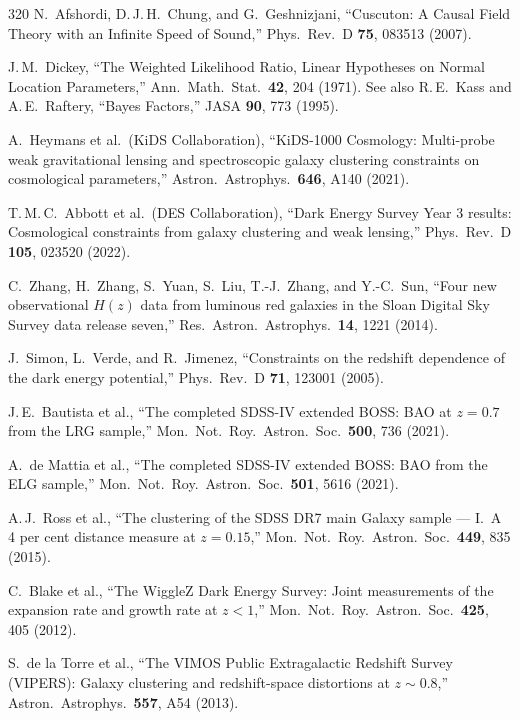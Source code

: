 \begin{thebibliography}{320}
N.\ Afshordi, D.\,J.\,H.\ Chung, and G.\ Geshnizjani,
``Cuscuton: A Causal Field Theory with an Infinite Speed of Sound,''
Phys.\ Rev.\ D \textbf{75}, 083513 (2007).

J.\,M.\ Dickey,
``The Weighted Likelihood Ratio, Linear Hypotheses on Normal Location Parameters,''
Ann.\ Math.\ Stat.\ \textbf{42}, 204 (1971).
See also R.\,E.\ Kass and A.\,E.\ Raftery,
``Bayes Factors,''
JASA \textbf{90}, 773 (1995).

A.\ Heymans et al.\ (KiDS Collaboration),
``KiDS-1000 Cosmology: Multi-probe weak gravitational lensing and spectroscopic galaxy clustering constraints on cosmological parameters,''
Astron.\ Astrophys.\ \textbf{646}, A140 (2021).

T.\,M.\,C.\ Abbott et al.\ (DES Collaboration),
``Dark Energy Survey Year 3 results: Cosmological constraints from galaxy clustering and weak lensing,''
Phys.\ Rev.\ D \textbf{105}, 023520 (2022).

C.\ Zhang, H.\ Zhang, S.\ Yuan, S.\ Liu, T.-J.\ Zhang, and Y.-C.\ Sun,
``Four new observational $H(z)$ data from luminous red galaxies in the Sloan Digital Sky Survey data release seven,''
Res.\ Astron.\ Astrophys.\ \textbf{14}, 1221 (2014).

J.\ Simon, L.\ Verde, and R.\ Jimenez,
``Constraints on the redshift dependence of the dark energy potential,''
Phys.\ Rev.\ D \textbf{71}, 123001 (2005).

J.\,E.\ Bautista et al.,
``The completed SDSS-IV extended BOSS: BAO at $z = 0.7$ from the LRG sample,''
Mon.\ Not.\ Roy.\ Astron.\ Soc.\ \textbf{500}, 736 (2021).

A.\ de Mattia et al.,
``The completed SDSS-IV extended BOSS: BAO from the ELG sample,''
Mon.\ Not.\ Roy.\ Astron.\ Soc.\ \textbf{501}, 5616 (2021).

A.\,J.\ Ross et al.,
``The clustering of the SDSS DR7 main Galaxy sample --- I.\ A 4 per cent distance measure at $z = 0.15$,''
Mon.\ Not.\ Roy.\ Astron.\ Soc.\ \textbf{449}, 835 (2015).

C.\ Blake et al.,
``The WiggleZ Dark Energy Survey: Joint measurements of the expansion rate and growth rate at $z < 1$,''
Mon.\ Not.\ Roy.\ Astron.\ Soc.\ \textbf{425}, 405 (2012).

S.\ de la Torre et al.,
``The VIMOS Public Extragalactic Redshift Survey (VIPERS): Galaxy clustering and redshift-space distortions at $z \sim 0.8$,''
Astron.\ Astrophys.\ \textbf{557}, A54 (2013).


\end{thebibliography}
